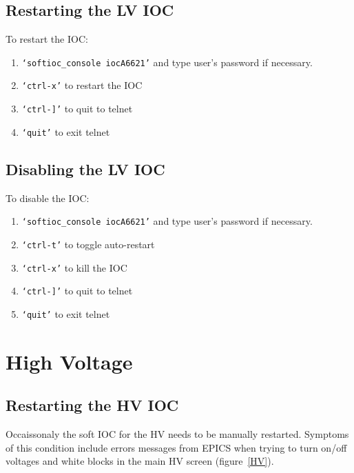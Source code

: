 \documentclass[12pt]{article}
\begin{document}
\subsection{Restarting the LV IOC}
   To restart the IOC:
   {\footnotesize
   \begin{enumerate}
       \item \texttt{`softioc\_console iocA6621'} and type user's password if necessary.
       \item \texttt{`ctrl-x'} to restart the IOC
       \item \texttt{`ctrl-]'} to quit to telnet
       \item \texttt{`quit'} to exit telnet
   \end{enumerate}
   }

\subsection{Disabling the LV IOC}\label{lviocstop}
   To disable the IOC:
   {\footnotesize
   \begin{enumerate}
       \item \texttt{`softioc\_console iocA6621'} and type user's password if necessary.
       \item \texttt{`ctrl-t'} to toggle auto-restart
       \item \texttt{`ctrl-x'} to kill the IOC
       \item \texttt{`ctrl-]'} to quit to telnet
       \item \texttt{`quit'} to exit telnet
   \end{enumerate}
   }

\newpage
   \section{High Voltage}
   \subsection{Restarting the HV IOC}
   Occaissonaly the soft IOC for the HV needs to be manually restarted.  Symptoms of this condition include errors messages from EPICS when trying to turn on/off voltages and white blocks in the main HV screen (figure~\ref{HV}).  
   
\end{document}
